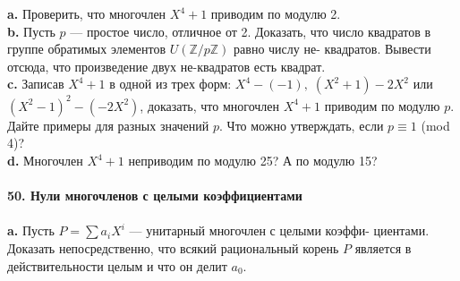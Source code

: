 \hspace*{10pt}\textbf{a.} Проверить, что многочлен $X^4+1$ приводим по модулю 2.\\
\hspace*{10pt}\textbf{b.} Пусть $p$ — простое число, отличное от 2. Доказать, что число\linebreak
квадратов в группе обратимых элементов $U(\mathbb{Z}/p\mathbb{Z})$ равно числу не-\linebreak
квадратов. Вывести отсюда, что произведение двух не-квадратов есть\linebreak
квадрат.\\
\hspace*{10pt}\textbf{c.} Записав $X^4+1$ в одной из трех форм: $X^4-(-1),\;(X^2+1)-2X^2$ или\linebreak
$(X^2-1)^2-(-2X^2)$, доказать, что многочлен $X^4+1$ приводим по модулю\linebreak
$p$. Дайте примеры для разных значений $p$. Что можно утверждать, если\linebreak
$p \equiv 1$ (mod 4)?\\
\hspace*{10pt}\textbf{d.} Многочлен $X^4+1$ неприводим по модулю 25? А по модулю 15?
\\
\\
\noindent\textbf{50. Нули многочленов с целыми коэффициентами}\\\\
\hspace*{10pt}\textbf{a.} Пусть $P=\sum a_iX^i$ — унитарный многочлен с целыми коэффи-\linebreak
циентами. Доказать непосредственно, что всякий рациональный корень\linebreak
$P$ является в действительности целым и что он делит $a_0$.\pagebreak


